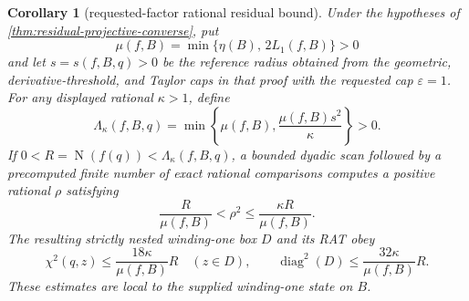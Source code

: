 \documentclass[11pt]{article}
\newtheorem{corollary}[theorem]{Corollary}
\newcommand{\Norm}[1]{\operatorname{N}\!\left(#1\right)}
\newcommand{\diamq}{\operatorname{diag}^{2}}
\newcommand{\eps}{\varepsilon}
\begin{document}
\begin{corollary}[requested-factor rational residual bound]
\label{cor:requested-residual-projective}
Under the hypotheses of \cref{thm:residual-projective-converse}, put
\[
 \mu(f,B)=\min\{\eta(B),\,2L_1(f,B)\}>0
\]
and let $s=s(f,B,q)>0$ be the reference radius obtained from the geometric,
derivative-threshold, and Taylor caps in that proof with the requested cap
$\eps=1$.  For any displayed rational $\kappa>1$, define
\[
 \Lambda_\kappa(f,B,q)=
 \min\left\{\mu(f,B),\frac{\mu(f,B)s^2}{\kappa}\right\}>0.
\]
If $0<R=\Norm{f(q)}<\Lambda_\kappa(f,B,q)$, a bounded dyadic scan followed
by a precomputed finite number of exact rational comparisons computes a
positive rational
$\rho$ satisfying
\[
       \frac{R}{\mu(f,B)}<\rho^2
       \le\frac{\kappa R}{\mu(f,B)}.
\]
The resulting strictly nested winding-one box $D$ and its RAT obey
\[
 \chi^2(q,z)\le\frac{18\kappa}{\mu(f,B)}R\quad(z\in D),
 \qquad
 \diamq(D)\le\frac{32\kappa}{\mu(f,B)}R.
\]
These estimates are local to the supplied winding-one state on $B$.
\end{corollary}
\end{document}
